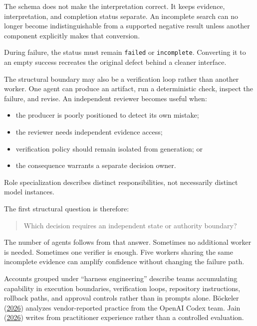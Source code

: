 The schema does not make the interpretation correct. It keeps evidence, interpretation, and completion status separate. An incomplete search can no longer become indistinguishable from a supported negative result unless another component explicitly makes that conversion.

During failure, the status must remain \texttt{failed} or \texttt{incomplete}. Converting it to an empty success recreates the original defect behind a cleaner interface.


The structural boundary may also be a verification loop rather than another worker. One agent can produce an artifact, run a deterministic check, inspect the failure, and revise. An independent reviewer becomes useful when:

\begin{itemize}
\tightlist
\item
  the producer is poorly positioned to detect its own mistake;
\item
  the reviewer needs independent evidence access;
\item
  verification policy should remain isolated from generation; or
\item
  the consequence warrants a separate decision owner.
\end{itemize}

Role specialization describes distinct responsibilities, not necessarily distinct model instances.

The first structural question is therefore:

\begin{quote}
Which decision requires an independent state or authority boundary?
\end{quote}

The number of agents follows from that answer. Sometimes no additional worker is needed. Sometimes one verifier is enough. Five workers sharing the same incomplete evidence can amplify confidence without changing the failure path.

Accounts grouped under ``harness engineering'' describe teams accumulating capability in execution boundaries, verification loops, repository instructions, rollback paths, and approval controls rather than in prompts alone. Böckeler (\href{https://martinfowler.com/articles/exploring-gen-ai/harness-engineering.html}{2026}) analyzes vendor-reported practice from the OpenAI Codex team. Jain (\href{https://www.reddit.com/r/devops/comments/1touxz4/}{2026}) writes from practitioner experience rather than a controlled evaluation.

